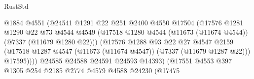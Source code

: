 \begin{lexlean}{RustStd}
\begin{coremodule}
                                          @1884
                                          @4551
                                          (@24541
                                            @1291
                                            @22
                                            @251
                                            @2400
                                            @4550
                                            @17504
                                            (@17576
                                              @1281
                                              @1290
                                              @22
                                              @73
                                              @4544
                                              @4549
                                              (@17518
                                                @1280
                                                @4544
                                                (@11673 (@11674 @4544))
                                                (@7337 (@11679 @1280 @22)))
                                              (@17576
                                                @1288
                                                @93
                                                @22
                                                @27
                                                @4547
                                                @2159
                                                (@17518
                                                  @1287
                                                  @4547
                                                  (@11673 (@11674 @4547))
                                                  (@7337 (@11679 @1287 @22)))
                                                @17595))))
                                        @24585
                                        @24588
                                        @24591
                                        @24593
                                        @14393)
                                      (@17551
                                        @4553
                                        @397
                                        @1305
                                        @254
                                        @2185
                                        @2774
                                        @4579
                                        @4588
                                        @24230
                                        (@17475

\end{coremodule}
\end{lexlean}
